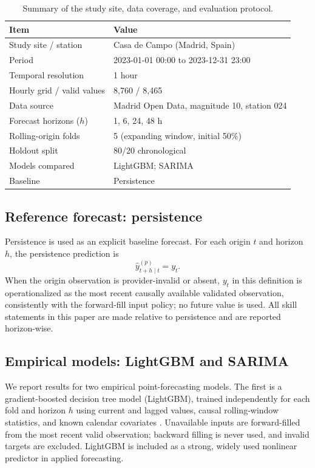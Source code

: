 \documentclass{article}
\begin{document}
\begin{table}[t]
\centering
\small
\caption{Summary of the study site, data coverage, and evaluation protocol.}
\label{tab:data_protocol}
\begin{tabular}{@{}ll@{}}
\toprule
Item & Value \\
\midrule
Study site / station       & Casa de Campo (Madrid, Spain) \\
Period                     & 2023-01-01 00:00 to 2023-12-31 23:00 \\
Temporal resolution        & 1 hour \\
Hourly grid / valid values & 8,760 / 8,465 \\
Data source                & Madrid Open Data, magnitude 10, station 024 \\
Forecast horizons ($h$)    & 1, 6, 24, 48 h \\
Rolling-origin folds       & 5 (expanding window, initial 50\%) \\
Holdout split              & 80/20 chronological \\
Models compared            & LightGBM; SARIMA \\
Baseline                   & Persistence \\
\bottomrule
\end{tabular}
\end{table}

\subsection{Reference forecast: persistence}

Persistence is used as an explicit baseline forecast.
For each origin $t$ and horizon $h$, the persistence prediction is
\begin{equation}
  \hat{y}^{(p)}_{t+h\mid t} = y_t.
\end{equation}
When the origin observation is provider-invalid or absent, $y_t$ in this
definition is operationalized as the most recent causally available validated
observation, consistently with the forward-fill input policy; no future value
is used.
All skill statements in this paper are made relative to persistence and are
reported horizon-wise.

\subsection{Empirical models: LightGBM and SARIMA}

We report results for two empirical point-forecasting models.
The first is a gradient-boosted decision tree model (LightGBM), trained
independently for each fold and horizon $h$ using current and lagged values,
causal rolling-window statistics, and known calendar covariates \citep{ke2017}.
Unavailable inputs are forward-filled from the most recent valid observation;
backward filling is never used, and invalid targets are excluded.
LightGBM is included as a strong, widely used nonlinear predictor in applied
forecasting.
\end{document}

